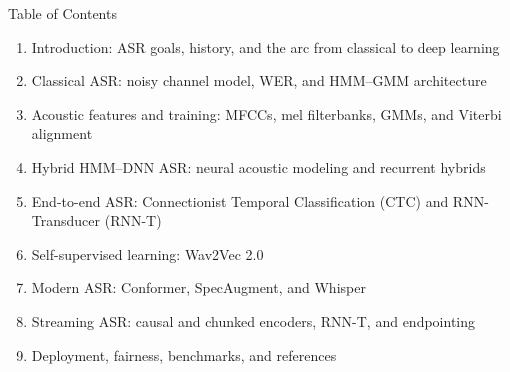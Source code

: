 \begin{frame}{Table of Contents}
  \begin{enumerate}\itemsep0.15em
    \item Introduction: ASR goals, history, and the arc from classical to deep learning
    \item Classical ASR: noisy channel model, WER, and HMM--GMM architecture
    \item Acoustic features and training: MFCCs, mel filterbanks, GMMs, and Viterbi alignment
    \item Hybrid HMM--DNN ASR: neural acoustic modeling and recurrent hybrids
    \item End-to-end ASR: Connectionist Temporal Classification (CTC) and RNN-Transducer (RNN-T)
    \item Self-supervised learning: Wav2Vec 2.0
    \item Modern ASR: Conformer, SpecAugment, and Whisper
    \item Streaming ASR: causal and chunked encoders, RNN-T, and endpointing
    \item Deployment, fairness, benchmarks, and references
  \end{enumerate}
\end{frame}
